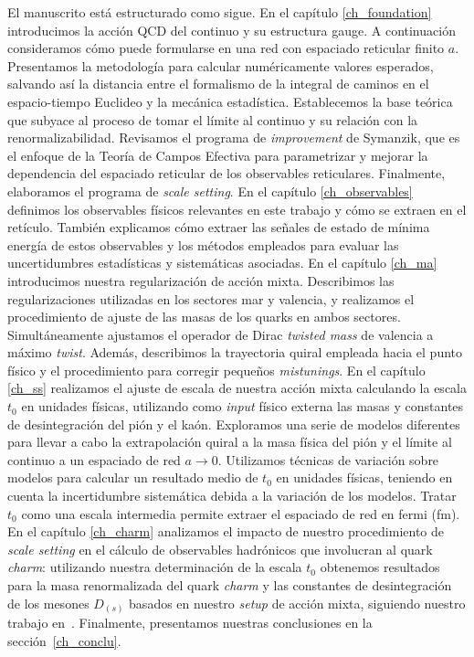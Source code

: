El manuscrito está estructurado como sigue. En el capítulo \ref{ch_foundation} introducimos la acción QCD del continuo y su estructura gauge. A continuación consideramos cómo puede formularse en una red con espaciado reticular finito $a$. Presentamos la metodología para calcular numéricamente valores esperados, salvando así la distancia entre el formalismo de la integral de caminos en el espacio-tiempo Euclideo y la mecánica estadística. Establecemos la base teórica que subyace al proceso de tomar el límite al continuo y su relación con la renormalizabilidad. Revisamos el programa de \textit{improvement} de Symanzik, que es el enfoque de la Teoría de Campos Efectiva para parametrizar y mejorar la dependencia del espaciado reticular de los observables reticulares. Finalmente, elaboramos el programa de \textit{scale setting}. En el capítulo \ref{ch_observables} definimos los observables físicos relevantes en este trabajo y cómo se extraen en el retículo. También explicamos cómo extraer las señales de estado de mínima energía de estos observables y los métodos empleados para evaluar las uncertidumbres estadísticas y sistemáticas asociadas. En el capítulo \ref{ch_ma} introducimos nuestra regularización de acción mixta. Describimos las regularizaciones utilizadas en los sectores mar y valencia, y realizamos el procedimiento de ajuste de las masas de los quarks en ambos sectores. Simultáneamente ajustamos el operador de Dirac \textit{twisted mass} de valencia a máximo \textit{twist}. Además, describimos la trayectoria quiral empleada hacia el punto físico y el procedimiento para corregir pequeños \textit{mistunings}. En el capítulo \ref{ch_ss} realizamos el ajuste de escala de nuestra acción mixta calculando la escala $t_0$ en unidades físicas, utilizando como \textit{input} físico externa las masas y constantes de desintegración del pión y el kaón. Exploramos una serie de modelos diferentes para llevar a cabo la extrapolación quiral a la masa física del pión y el límite al continuo a un espaciado de red $a\to0$. Utilizamos técnicas de variación sobre modelos para calcular un resultado medio de $t_0$ en unidades físicas, teniendo en cuenta la incertidumbre sistemática debida a la variación de los modelos. Tratar $t_0$ como una escala intermedia permite extraer el espaciado de red en fermi (fm). En el capítulo \ref{ch_charm} analizamos el impacto de nuestro procedimiento de \textit{scale setting} en el cálculo de observables hadrónicos que involucran al quark \textit{charm}: utilizando nuestra determinación de la escala $t_0$ obtenemos resultados para la masa renormalizada del quark \textit{charm} y las constantes de desintegración de los mesones $D_{(s)}$ basados en nuestro \textit{setup} de acción mixta, siguiendo nuestro trabajo en~\citep{charm}. Finalmente, presentamos nuestras conclusiones en la sección~\ref{ch_conclu}.

